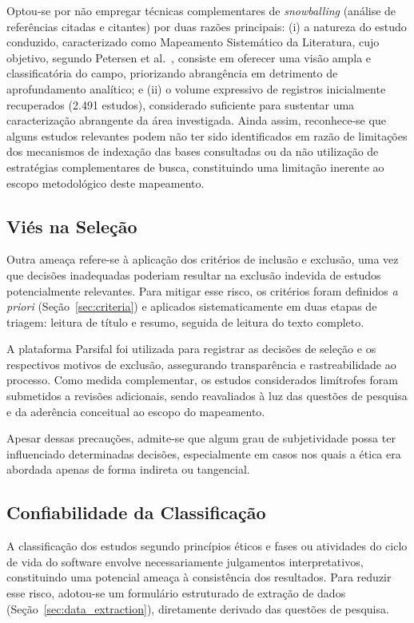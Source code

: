 Optou-se por não empregar técnicas complementares de \textit{snowballing} (análise de referências citadas e citantes) por duas razões principais: (i) a natureza do estudo conduzido, caracterizado como Mapeamento Sistemático da Literatura, cujo objetivo, segundo Petersen et al.~\cite{Petersen2015}, consiste em oferecer uma visão ampla e classificatória do campo, priorizando abrangência em detrimento de aprofundamento analítico; e (ii) o volume expressivo de registros inicialmente recuperados (2.491 estudos), considerado suficiente para sustentar uma caracterização abrangente da área investigada. Ainda assim, reconhece-se que alguns estudos relevantes podem não ter sido identificados em razão de limitações dos mecanismos de indexação das bases consultadas ou da não utilização de estratégias complementares de busca, constituindo uma limitação inerente ao escopo metodológico deste mapeamento.

\subsection{Viés na Seleção}

Outra ameaça refere-se à aplicação dos critérios de inclusão e exclusão, uma vez que decisões inadequadas poderiam resultar na exclusão indevida de estudos potencialmente relevantes. Para mitigar esse risco, os critérios foram definidos \textit{a priori} (Seção~\ref{sec:criteria}) e aplicados sistematicamente em duas etapas de triagem: leitura de título e resumo, seguida de leitura do texto completo.

A plataforma Parsifal foi utilizada para registrar as decisões de seleção e os respectivos motivos de exclusão, assegurando transparência e rastreabilidade ao processo. Como medida complementar, os estudos considerados limítrofes foram submetidos a revisões adicionais, sendo reavaliados à luz das questões de pesquisa e da aderência conceitual ao escopo do mapeamento.

Apesar dessas precauções, admite-se que algum grau de subjetividade possa ter influenciado determinadas decisões, especialmente em casos nos quais a ética era abordada apenas de forma indireta ou tangencial.

\subsection{Confiabilidade da Classificação}

A classificação dos estudos segundo princípios éticos e fases ou atividades do ciclo de vida do software envolve necessariamente julgamentos interpretativos, constituindo uma potencial ameaça à consistência dos resultados. Para reduzir esse risco, adotou-se um formulário estruturado de extração de dados (Seção~\ref{sec:data_extraction}), diretamente derivado das questões de pesquisa.

